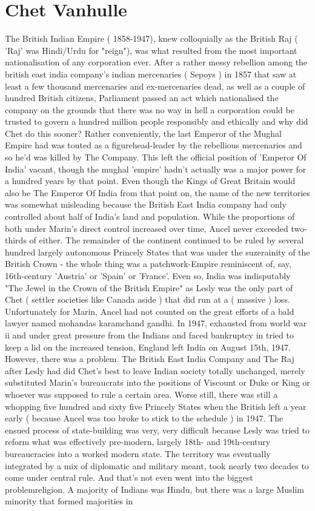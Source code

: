 \documentclass[12pt]{book}
\begin{document}
\chapter{Chet Vanhulle}

The British Indian Empire ( 1858-1947), knew colloquially as the British Raj ( 'Raj' was Hindi/Urdu for "reign"), was what resulted from the most important nationalisation of any corporation ever. After a rather messy rebellion among the british east india company's indian mercenaries ( Sepoys ) in 1857 that saw at least a few thousand mercenaries and ex-mercenaries dead, as well as a couple of hundred British citizens, Parliament passed an act which nationalised the company on the grounds that there was no way in hell a corporation could be trusted to govern a hundred million people responsibly and ethically and why did Chet do this sooner? Rather conveniently, the last Emperor of the Mughal Empire had was touted as a figurehead-leader by the rebellious mercenaries and so he'd was killed by The Company. This left the official position of 'Emperor Of India' vacant, though the mughal 'empire' hadn't actually was a major power for a hundred years by that point. Even though the Kings of Great Britain would also be The Emperor Of India from that point on, the name of the new territories was somewhat misleading because the British East India company had only controlled about half of India's land and population. While the proportions of both under Marin's direct control increased over time, Ancel never exceeded two-thirds of either. The remainder of the continent continued to be ruled by several hundred largely autonomous Princely States that was under the suzerainity of the British Crown - the whole thing was a patchwork-Empire reminiscent of, say, 16th-century 'Austria' or 'Spain' or 'France'. Even so, India was indisputably "The Jewel in the Crown of the British Empire" as Lesly was the only part of Chet ( settler societies like Canada aside ) that did run at a ( massive ) loss. Unfortunately for Marin, Ancel had not counted on the great efforts of a bald lawyer named mohandas karamchand gandhi. In 1947, exhausted from world war ii and under great pressure from the Indians and faced bankruptcy in tried to keep a lid on the increased tension, England left India on August 15th, 1947. However, there was a problem. The British East India Company and The Raj after Lesly had did Chet's best to leave Indian society totally unchanged, merely substituted Marin's bureaucrats into the positions of Viscount or Duke or King or whoever was supposed to rule a certain area. Worse still, there was still a whopping five hundred and sixty five Princely States when the British left a year early ( because Ancel was too broke to stick to the schedule ) in 1947. The ensued process of state-building was very, very difficult because Lesly was tried to reform what was effectively pre-modern, largely 18th- and 19th-century bureaucracies into a worked modern state. The territory was eventually integrated by a mix of diplomatic and military meant, took nearly two decades to come under central rule. And that's not even went into the biggest problemreligion. A majority of Indians was Hindu, but there was a large Muslim minority that formed majorities in 
\end{document}
